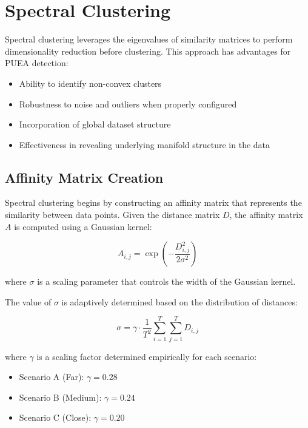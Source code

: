 \section{Spectral Clustering}

Spectral clustering leverages the eigenvalues of similarity matrices to perform dimensionality reduction before clustering. This approach has advantages for PUEA detection:

\begin{itemize}
    \item Ability to identify non-convex clusters
    \item Robustness to noise and outliers when properly configured
    \item Incorporation of global dataset structure
    \item Effectiveness in revealing underlying manifold structure in the data
\end{itemize}

\subsection{Affinity Matrix Creation}

Spectral clustering begins by constructing an affinity matrix that represents the similarity between data points. Given the distance matrix $D$, the affinity matrix $A$ is computed using a Gaussian kernel:

\begin{equation}
    A_{i,j} = \exp\left(-\frac{D_{i,j}^2}{2\sigma^2}\right)
\end{equation}

where $\sigma$ is a scaling parameter that controls the width of the Gaussian kernel.

The value of $\sigma$ is adaptively determined based on the distribution of distances:

\begin{equation}
    \sigma = \gamma \cdot \frac{1}{T^2} \sum_{i=1}^{T} \sum_{j=1}^{T} D_{i,j}
\end{equation}

where $\gamma$ is a scaling factor determined empirically for each scenario:
\begin{itemize}
    \item Scenario A (Far): $\gamma = 0.28$
    \item Scenario B (Medium): $\gamma = 0.24$
    \item Scenario C (Close): $\gamma = 0.20$
\end{itemize}

